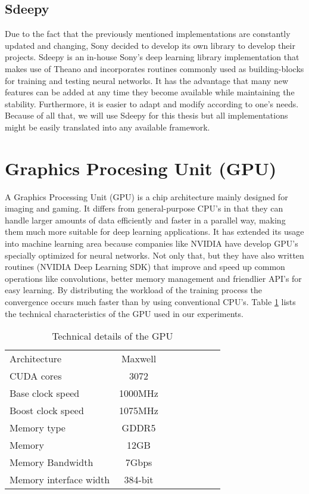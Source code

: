 \FloatBarrier
     
\subsection{Sdeepy}
Due to the fact that the previously mentioned implementations are constantly updated and changing, Sony decided to develop its own library to develop their projects. Sdeepy is an in-house Sony's deep learning library implementation that makes use of Theano and incorporates routines commonly used as building-blocks for training and testing neural networks. It has the advantage that many new features can be added at any time they become available while maintaining the stability. Furthermore, it is easier to adapt and modify according to one's needs. Because of all that, we will use Sdeepy for this thesis but all implementations might be easily translated into any available framework.

\FloatBarrier

\section{Graphics Procesing Unit (GPU)}
A Graphics Processing Unit (GPU) is a chip architecture mainly designed for imaging and gaming. It differs from general-purpose CPU's in that they can handle larger amounts of data efficiently and faster in a parallel way, making them much more suitable for deep learning applications. It has extended its usage into machine learning area because companies like NVIDIA have develop GPU's specially optimized for neural networks. Not only that, but they have also written routines (NVIDIA Deep Learning SDK) that improve and speed up common operations like convolutions, better memory management and friendlier API's for easy learning. By distributing the workload of the training process the convergence occurs much faster than by using conventional CPU's. Table \ref{tab:GPU1} lists the technical characteristics of the GPU used in our experiments.

\begin{table}[tb]
\caption[Technical speficications of GeForce GTX Titan]{Technical details of the GPU}
\label{tab:GPU1}
\centering
\begin{tabular}{l*{6}{c}r}
\hline
Architecture   & Maxwell\\
CUDA cores   & 3072\\
Base clock speed   & 1000MHz\\
Boost clock speed   & 1075MHz\\
Memory type   & GDDR5\\
Memory    & 12GB\\
Memory Bandwidth    & 7Gbps\\
Memory interface width    & 384-bit\\
\bottomrule 
\end{tabular}  
\end{table}

